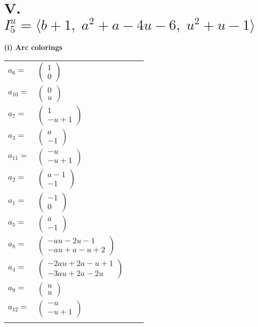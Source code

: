 \documentclass[1p]{elsarticle_modified}
\theoremstyle{definition}
\begin{document}
\centering \section*{V. $I^u_{5}= \langle b+1,\;a^2+a-4 u-6,\;u^2+u-1 \rangle$}
\flushleft \textbf{(i) Arc colorings}\\
\begin{tabular}{m{7pt} m{180pt} m{7pt} m{180pt} }
\flushright $a_{6}=$&$\begin{pmatrix}1\\0\end{pmatrix}$ \\
\flushright $a_{10}=$&$\begin{pmatrix}0\\u\end{pmatrix}$ \\
\flushright $a_{7}=$&$\begin{pmatrix}1\\- u+1\end{pmatrix}$ \\
\flushright $a_{3}=$&$\begin{pmatrix}a\\-1\end{pmatrix}$ \\
\flushright $a_{11}=$&$\begin{pmatrix}- u\\- u+1\end{pmatrix}$ \\
\flushright $a_{2}=$&$\begin{pmatrix}a-1\\-1\end{pmatrix}$ \\
\flushright $a_{1}=$&$\begin{pmatrix}-1\\0\end{pmatrix}$ \\
\flushright $a_{5}=$&$\begin{pmatrix}a\\-1\end{pmatrix}$ \\
\flushright $a_{8}=$&$\begin{pmatrix}- a u-2 u-1\\- a u+a- u+2\end{pmatrix}$ \\
\flushright $a_{4}=$&$\begin{pmatrix}-2 a u+2 a- u+1\\-3 a u+2 a-2 u\end{pmatrix}$ \\
\flushright $a_{9}=$&$\begin{pmatrix}u\\u\end{pmatrix}$ \\
\flushright $a_{12}=$&$\begin{pmatrix}- u\\- u+1\end{pmatrix}$\\&\end{tabular}
\end{document}
